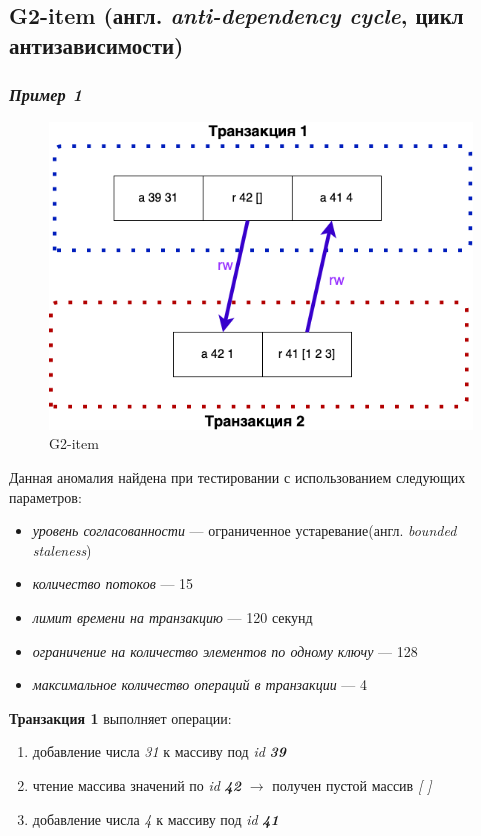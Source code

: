 \documentclass[12pt,  openany]{book}
\begin{document}
\subsection{G2-item (англ. \textit{anti-dependency cycle}, цикл антизависимости)}
\subsubsection{\textit{Пример 1}}
\begin{figure}[H]
  \includegraphics[width=\textwidth]{images/g2item1.png}
  \caption{G2-item}
\end{figure}

\par
Данная аномалия найдена при тестировании с использованием следующих параметров: 
\begin{itemize}
\item[] \textit{уровень согласованности} --- ограниченное устаревание(англ.  \textit{bounded staleness})
\item[] \textit{количество потоков} --- 15
\item[] \textit{лимит времени на транзакцию} --- 120 секунд
\item[] \textit{ограничение на количество элементов по одному ключу} --- 128
\item[] \textit{максимальное количество операций в транзакции} --- 4
\end{itemize}

\textbf{Транзакция 1} выполняет операции:
\begin{enumerate}
\item добавление числа \textit{31} к массиву под \textit{id} \textit{\textbf{39}}
\item чтение массива значений по \textit{id} \textit{\textbf{42}} $\rightarrow$ получен пустой массив \textit{[ ]}
\item добавление числа \textit{4} к массиву под \textit{id} \textit{\textbf{41}}
\end{enumerate}
\end{document}
